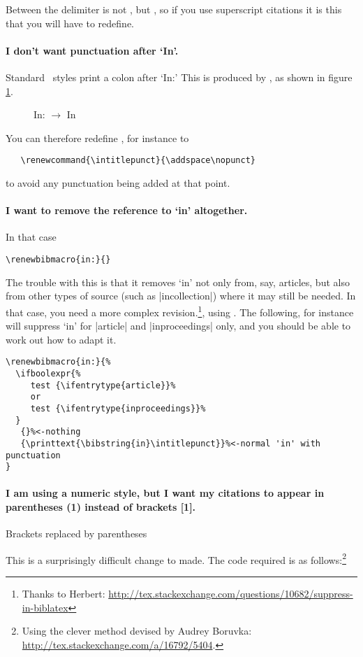 Between  the delimiter is not
, but , so if you use
superscript citations it is this that you will have to redefine.

\paragraph{I don't want punctuation after `In'.} Standard \biblatex\
styles print a colon after `In:' This is produced by
, as shown in figure \ref{punctcite7}.
\begin{figure}
\caption{In: $\rightarrow$ In}\label{punctcite7}
\end{figure}

You can therefore redefine , for instance to
\begin{Verbatim}
   \renewcommand{\intitlepunct}{\addspace\nopunct}
\end{Verbatim}
to avoid any punctuation being added at that point.

\paragraph{I want to remove the reference to `in' altogether.}

In that case
\begin{verbatim}
\renewbibmacro{in:}{}
\end{verbatim}

The trouble with this is that it removes `in' not only from, say,
articles, but also from other types of source (such as |incollection|)
where it may still be needed. In that case, you need a more complex
revision.\footnote{Thanks to Herbert:
  \url{http://tex.stackexchange.com/questions/10682/suppress-in-biblatex}},
using \cs[\angled{type}]{ifentrytype}. The following, for instance will
suppress `in' for |article| and |inproceedings| only, and you should
be able to work out how to adapt it.
\begin{verbatim}
\renewbibmacro{in:}{%
  \ifboolexpr{%
     test {\ifentrytype{article}}%
     or
     test {\ifentrytype{inproceedings}}%
  }
   {}%<-nothing
   {\printtext{\bibstring{in}\intitlepunct}}%<-normal 'in' with punctuation
}
\end{verbatim}


\paragraph{I am using a numeric style, but I want my citations to
  appear in parentheses (1) instead of brackets
  [1].}\label{recipe:brackets}
\begin{marginfigure}[8ex]
\vspace{3pt}%
\caption{Brackets replaced by parentheses}\label{punctcite8}
\end{marginfigure}
This is a surprisingly difficult change to made. The code required is
as follows:\footnote{Using the clever method devised by Audrey
  Boruvka: \url{http://tex.stackexchange.com/a/16792/5404}.}

